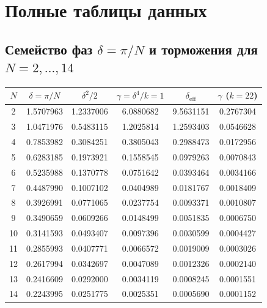 
\section{Полные таблицы данных}\label{app:fulldata}

\subsection{Семейство фаз $\delta=\pi/N$ и торможения для $N=2,\dots,14$}

\begin{center}
\small
\begin{tabular}{@{}c c c c c c@{}}
\toprule
$N$ & $\delta=\pi/N$ & $\delta^2/2$ & $\gamma=\delta^4/k{=}1$ &
$\delta_{\mathrm{eff}}$ & $\gamma$ ($k=22$) \\
\midrule
2  & 1.5707963 & 1.2337006 & 6.0880682 & 9.5631151 & 0.2767304 \\
3  & 1.0471976 & 0.5483115 & 1.2025814 & 1.2593403 & 0.0546628 \\
4  & 0.7853982 & 0.3084251 & 0.3805043 & 0.2988473 & 0.0172956 \\
5  & 0.6283185 & 0.1973921 & 0.1558545 & 0.0979263 & 0.0070843 \\
6  & 0.5235988 & 0.1370778 & 0.0751642 & 0.0393464 & 0.0034166 \\
7  & 0.4487990 & 0.1007102 & 0.0404989 & 0.0181767 & 0.0018409 \\
8  & 0.3926991 & 0.0771065 & 0.0237754 & 0.0093371 & 0.0010807 \\
9  & 0.3490659 & 0.0609266 & 0.0148499 & 0.0051835 & 0.0006750 \\
10 & 0.3141593 & 0.0493407 & 0.0097396 & 0.0030599 & 0.0004427 \\
11 & 0.2855993 & 0.0407771 & 0.0066572 & 0.0019009 & 0.0003026 \\
12 & 0.2617994 & 0.0342697 & 0.0047089 & 0.0012326 & 0.0002140 \\
13 & 0.2416609 & 0.0292000 & 0.0034119 & 0.0008245 & 0.0001551 \\
14 & 0.2243995 & 0.0251775 & 0.0025351 & 0.0005690 & 0.0001152 \\
\bottomrule
\end{tabular}
\end{center}

